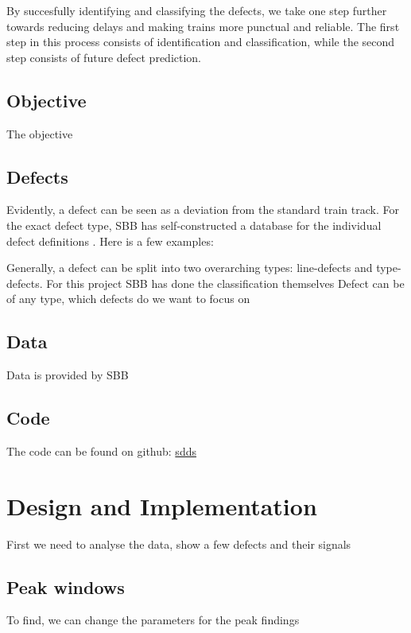 By succesfully identifying and classifying the defects, we take one step further towards reducing delays and making trains more punctual and reliable. The first step in this process consists of identification and classification, while the second step consists of future defect prediction.

\section{Objective}
The objective 

\section{Defects}
Evidently, a defect can be seen as a deviation from the standard train track. For the exact defect type, SBB has self-constructed a database for the individual defect definitions . Here is a few examples:


Generally, a defect can be split into two overarching types: line-defects and type-defects. For this project
SBB has done the classification themselves
Defect can be of any type, which defects do we want to focus on

\section{Data}
Data is provided by SBB

\section{Code}
The code can be found on github: \url{sdds}


\chapter{Design and Implementation}
First we need to analyse the data, show a few defects and their signals 


\section{Peak windows}
To find,
we can change the parameters for the peak findings
